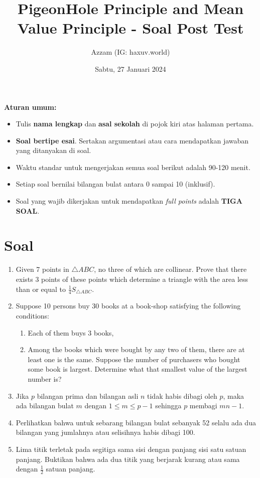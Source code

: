 \documentclass[12pt]{scrartcl}
\title{PigeonHole Principle and Mean Value Principle - Soal Post Test}
\author{Azzam (IG: haxuv.world)}
\date{Sabtu, 27 Januari 2024}
\begin{document}
\maketitle

\renewcommand*\contentsname{Daftar Isi}
\tableofcontents

\newpage
\textbf{Aturan umum:}
\begin{itemize}
    \item Tulis \textbf{nama lengkap} dan \textbf{asal sekolah} di pojok kiri atas halaman pertama.
    \item \textbf{Soal bertipe esai}. Sertakan argumentasi atau cara mendapatkan jawaban yang ditanyakan di soal.
    \item Waktu standar untuk mengerjakan semua soal berikut adalah 90-120 menit.
    \item Setiap soal bernilai bilangan bulat antara 0 sampai 10 (inklusif).
    \item Soal yang wajib dikerjakan untuk mendapatkan \textit{full points} adalah \textbf{TIGA SOAL}.
\end{itemize}


\section{Soal}
\begin{enumerate}
    \item Given 7 points in $\triangle ABC$, no three of which are collinear. Prove that there exists 3 points of these points which determine a triangle with the area less than or equal to $\frac{1}{4} S_{\triangle ABC}$.

       \item Suppose 10 persons buy 30 books at a book-shop satisfying the following conditions:
    \begin{enumerate}
        \item Each of them buys 3 books,
        \item Among the books which were bought by any two of them, there are at least one is the same. 
        Suppose the number of purchasers who bought some book is largest. Determine what that smallest value of the largest number is? 
    \end{enumerate}
    
    \item Jika $p$ bilangan prima dan bilangan asli $n$ tidak habis dibagi oleh $p$, maka ada bilangan bulat $m$ dengan $1 \leq m \leq p - 1$ sehingga $p$ membagi $mn - 1$.\\

    \item Perlihatkan bahwa untuk sebarang bilangan bulat sebanyak 52 selalu ada dua bilangan yang jumlahnya atau selisihnya habis dibagi 100.

    \item Lima titik terletak pada segitiga sama sisi dengan panjang sisi satu satuan panjang. Buktikan bahwa ada dua titik yang berjarak kurang atau sama dengan $\frac{1}{2}$ satuan panjang.
\end{enumerate}
\end{document}
